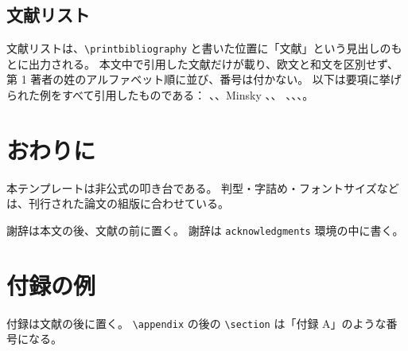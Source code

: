 \documentclass[paper]{bunkajoho}
\begin{document}
\subsection{文献リスト}

文献リストは、\verb|\printbibliography| と書いた位置に「文献」という見出しのもとに出力される。
本文中で引用した文献だけが載り、欧文と和文を区別せず、第 1 著者の姓のアルファベット順に並び、番号は付かない。
以下は要項に挙げられた例をすべて引用したものである：
\citet{miller1956}、\citet{cohen1985}、Minsky \citep*{minsky1986,minsky1986b}、\citet{saeki1990}、
\citet{minsky1975}、\citet{perrault1990b}、\citet{rosenschein1987}、\citet{devins1981}。

\section{おわりに}

本テンプレートは非公式の叩き台である。
判型・字詰め・フォントサイズなどは、刊行された論文の組版に合わせている。

\begin{acknowledgments}
謝辞は本文の後、文献の前に置く。
謝辞は \verb|acknowledgments| 環境の中に書く。
\end{acknowledgments}

\printbibliography

\appendix

\section{付録の例}

付録は文献の後に置く。
\verb|\appendix| の後の \verb|\section| は「付録 A」のような番号になる。
\end{document}
